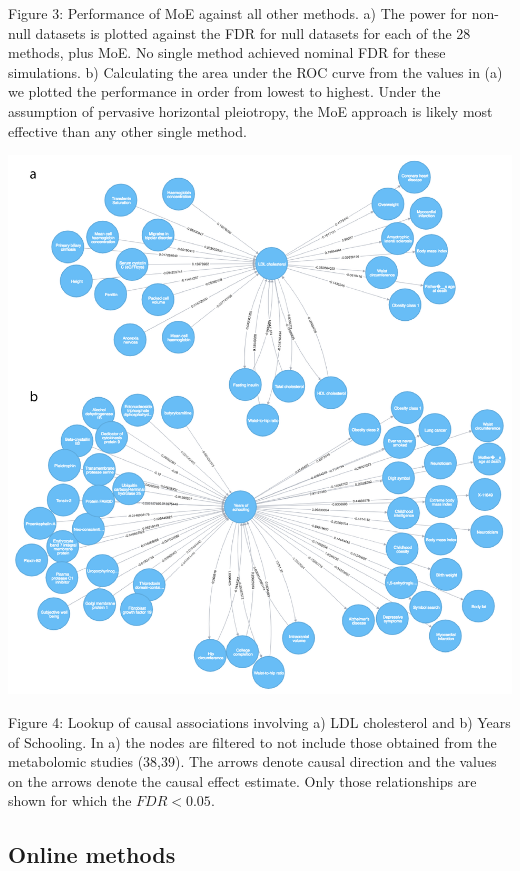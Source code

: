 \documentclass[]{article}
\begin{document}
Figure 3: Performance of MoE against all other methods. a) The power for
non-null datasets is plotted against the FDR for null datasets for each
of the 28 methods, plus MoE. No single method achieved nominal FDR for
these simulations. b) Calculating the area under the ROC curve from the
values in (a) we plotted the performance in order from lowest to
highest. Under the assumption of pervasive horizontal pleiotropy, the
MoE approach is likely most effective than any other single method.

\newpage

\includegraphics{images/fig4-01.png}

Figure 4: Lookup of causal associations involving a) LDL cholesterol and
b) Years of Schooling. In a) the nodes are filtered to not include those
obtained from the metabolomic studies (38,39). The arrows denote causal
direction and the values on the arrows denote the causal effect
estimate. Only those relationships are shown for which the
\(FDR < 0.05\).

\newpage

\subsection{Online methods}\label{online-methods}
\end{document}
